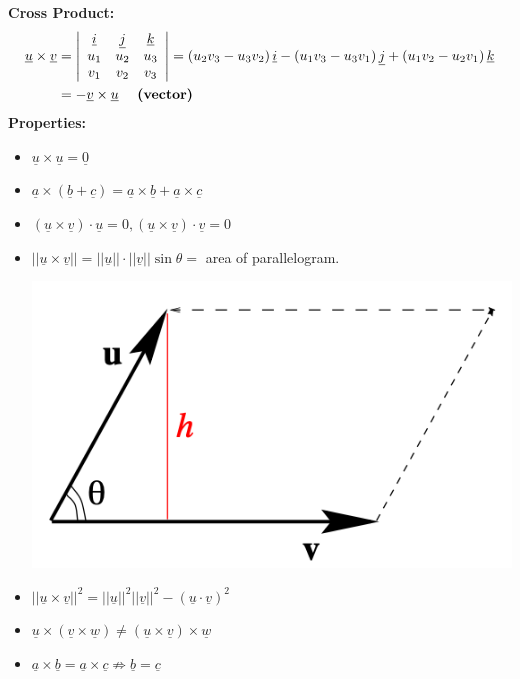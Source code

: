 \documentclass[11pt, a4paper]{MATH2023}
\newcommand{\vct}{\underline}
\newcommand{\vv}{\underline{v}}
\newcommand{\uu}{\underline{u}}
\newcommand{\ww}{\underline{w}}
\newcommand{\ii}{\underline{i}}
\newcommand{\kk}{\underline{k}}
\newcommand{\jj}{\underline{j}}
\newcommand{\va}{\underline{a}}
\newcommand{\bb}{\underline{b}}
\newcommand{\cc}{\underline{c}}
\begin{document}
\begin{spacing}{1.3}
    {\bf Cross Product:}
    \def\arraystretch{0.8}
    \begin{align*} 
        \uu \times \vv &=\left|
            \begin{array}{ccc}
                \ii & \jj & \kk \\ 
                u_{1} & u_{2} & u_{3} \\ 
                v_{1} & v_{2} & v_{3}
            \end{array}
            \right|
        =\left(u_{2} v_{3}-u_{3} v_{2}\right) \ii-
        \left(u_{1} v_{3}-u_{3} v_{1}\right) \jj+
        \left(u_{1} v_{2}-u_{2} v_{1}\right) \kk \\ 
        &=-\vv \times \uu \quad \text { \bf (vector) } 
    \end{align*}
    {\bf Properties:}
    \begin{itemize}
        \item $\uu\times \uu = \vct{0}$
        \item $\va\times(\bb+\cc)=\va\times \bb+\va\times \cc$
        \item $(\uu\times \vv)\cdot \uu=0, (\uu\times \vv)\cdot \vv=0$
        \item $||\uu\times \vv||=||\uu||\cdot ||\vv||\sin\theta=$ area of parallelogram.
        \begin{center}
            \includegraphics[scale=0.5]{images/Ch10-cross-product-geometry.png}
        \end{center}
        \item $||\uu \times \vv||^2=||\uu||^2||\vv||^2-(\uu\cdot \vv)^2$
        \item $\uu\times(\vv\times \ww)\ne (\uu\times \vv)\times \ww$
        \item $\vct{a}\times \vct{b}=\vct{a}\times \vct{c} \nRightarrow \vct{b}=\vct{c}$
    \end{itemize}


\end{spacing}
\end{document}
